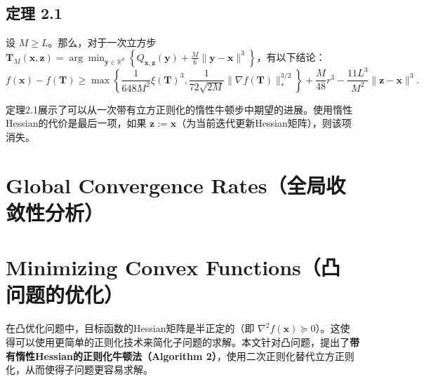 \documentclass[a4paper,twoside,AutoFakeBold]{article}
\theoremstyle{definition}
\begin{document}
\subsection*{定理 2.1}

设 \(M \geq L\)。那么，对于一次立方步$
\mathbf{T}_{M}(\mathbf{x},\mathbf{z}) = \arg\min_{\mathbf{y}\in\mathbb{R}^{d}} 
\left\{ Q_{\mathbf{x}, \mathbf{z}}(\mathbf{y}) + \frac{M}{6} \|\mathbf{y} - \mathbf{x}\|^{3} \right\}
$，有以下结论：
\[
f(\mathbf{x}) - f(\mathbf{T}) \geq \max \left\{ \frac{1}{648M^{2}} \xi(\mathbf{T})^{3}, \frac{1}{72\sqrt{2M}} \|\nabla f(\mathbf{T})\|_{*}^{3/2} \right\} + \frac{M}{48} r^{3} - \frac{11L^{3}}{M^{2}} \|\mathbf{z} - \mathbf{x}\|^{3}.
\]

定理2.1展示了可以从一次带有立方正则化的惰性牛顿步中期望的进展。使用惰性Hessian的代价是最后一项，如果 \(\mathbf{z} := \mathbf{x}\)（为当前迭代更新Hessian矩阵），则该项消失。


\section{Global Convergence Rates（全局收敛性分析）}


\newpage
\section{Minimizing Convex Functions（凸问题的优化）}
在凸优化问题中，目标函数的Hessian矩阵是半正定的（即 \(\nabla^{2}f(\mathbf{x}) \succeq 0\)）。这使得可以使用更简单的正则化技术来简化子问题的求解。本文针对凸问题，提出了\textbf{带有惰性Hessian的正则化牛顿法（Algorithm 2）}，使用二次正则化替代立方正则化，从而使得子问题更容易求解。
\end{document}
